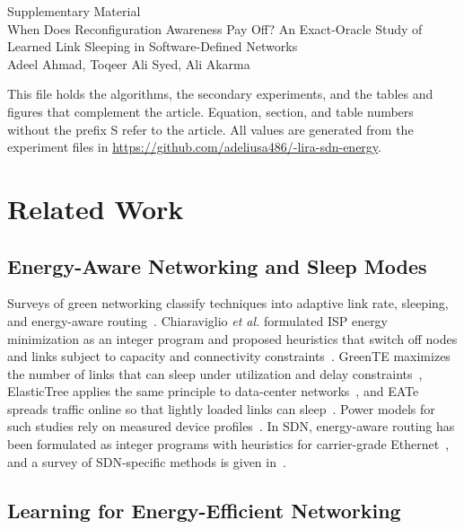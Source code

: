 \documentclass[preprint,12pt]{elsarticle}
\begin{document}
\begin{center}{\Large Supplementary Material}\\[6pt]
When Does Reconfiguration Awareness Pay Off? An Exact-Oracle Study of Learned Link Sleeping in Software-Defined Networks\\[6pt]
Adeel Ahmad, Toqeer Ali Syed, Ali Akarma\end{center}

This file holds the algorithms, the secondary experiments, and the tables and figures that complement the article. Equation, section, and table numbers without the prefix S refer to the article. All values are generated from the experiment files in \url{https://github.com/adeliusa486/-lira-sdn-energy}.

\section{Related Work}\label{sec:related-full}

\subsection*{Energy-Aware Networking and Sleep Modes}

Surveys of green networking classify techniques into adaptive link rate, sleeping, and energy-aware routing~\cite{bianzino2012survey,bolla2011energy}. Chiaraviglio \emph{et al.} formulated ISP energy minimization as an integer program and proposed heuristics that switch off nodes and links subject to capacity and connectivity constraints~\cite{chiaraviglio2012minimizing}. GreenTE maximizes the number of links that can sleep under utilization and delay constraints~\cite{zhang2010greente}, ElasticTree applies the same principle to data-center networks~\cite{heller2010elastictree}, and EATe spreads traffic online so that lightly loaded links can sleep~\cite{vasic2010eate}. Power models for such studies rely on measured device profiles~\cite{mahadevan2009power,restrepo2009energy,vishwanath2014modeling}. In SDN, energy-aware routing has been formulated as integer programs with heuristics for carrier-grade Ethernet~\cite{maaloul2018carrier}, and a survey of SDN-specific methods is given in~\cite{assefa2019survey}.

\subsection*{Learning for Energy-Efficient Networking}
\end{document}
